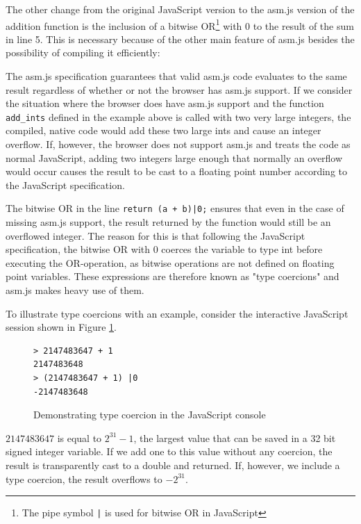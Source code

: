 \documentclass[11pt]{report}
\begin{document}
The other change from the original JavaScript version to the asm.js version of the addition function is the inclusion of a bitwise OR\footnote{The pipe symbol \texttt{|} is used for bitwise OR in JavaScript} with 0 to the result of the sum in line 5. This is necessary because of the other main feature of asm.js besides the possibility of compiling it efficiently:

The asm.js specification \cite{asmjsspec} guarantees that valid asm.js code evaluates to the same result regardless of whether or not the browser has asm.js support. If we consider the situation where the browser does have asm.js support and the function \texttt{add_ints} defined in the example above is called with two very large integers, the compiled, native code would add these two large ints and cause an integer overflow. If, however, the browser does not support asm.js and treats the code as normal JavaScript, adding two integers large enough that normally an overflow would occur causes the result to be cast to a floating point number according to the JavaScript specification.

The bitwise OR in the line \texttt{return (a + b)|0;} ensures that even in the case of missing asm.js support, the result returned by the function would still be an overflowed integer. The reason for this is that following the JavaScript specification, the bitwise OR with 0 coerces the variable to type int before executing the OR-operation, as bitwise operations are not defined on floating point variables. These expressions are therefore known as "type coercions" and asm.js makes heavy use of them.

To illustrate type coercions with an example, consider the interactive JavaScript session shown in Figure \ref{jstypecoercion}.

\begin{figure}[ht]
\begin{lstlisting}
> 2147483647 + 1
2147483648
> (2147483647 + 1) |0
-2147483648
\end{lstlisting}
\caption{Demonstrating type coercion in the JavaScript console}
\label{jstypecoercion}
\end{figure}

$2147483647$ is equal to $2^{31}-1$, the largest value that can be saved in a 32 bit signed integer variable. If we add one to this value without any coercion, the result is transparently cast to a double and returned. If, however, we include a type coercion, the result overflows to $-2^{31}$.
\end{document}
